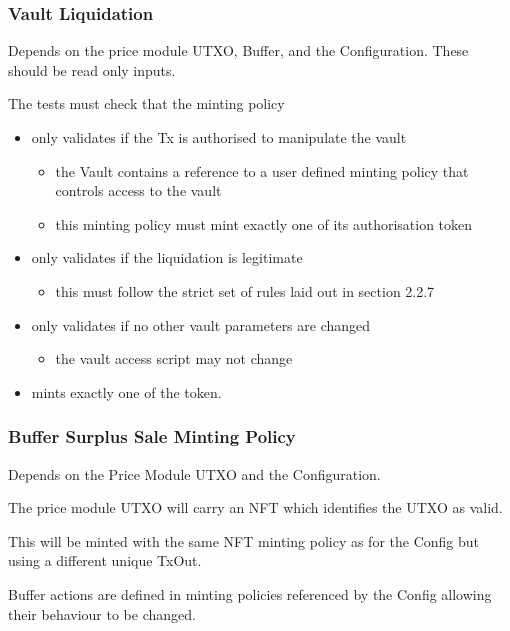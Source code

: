 \documentclass{article} %
\begin{document}
\subsubsection{Vault Liquidation}
Depends on the price module UTXO, Buffer, and the Configuration.
These should be read only inputs.

The tests must check that the minting policy
\begin{itemize}
  \item only validates if the Tx is authorised to manipulate the vault
  \begin{itemize}
    \item the Vault contains a reference to a user defined minting policy that controls access to the vault
    \item this minting policy must mint exactly one of its authorisation token
  \end{itemize}
  \item only validates if the liquidation is legitimate
  \begin{itemize}
    \item this must follow the strict set of rules laid out in section 2.2.7
  \end{itemize}
  \item only validates if no other vault parameters are changed
  \begin{itemize}
    \item the vault access script may not change
  \end{itemize}
  \item mints exactly one of the token.
\end{itemize}

\subsubsection{Buffer Surplus Sale Minting Policy}
Depends on the Price Module UTXO and the Configuration.

The price module UTXO will carry an NFT which identifies the UTXO as valid.

This will be minted with the same NFT minting policy as for the Config but using a different unique TxOut.

Buffer actions are defined in minting policies referenced by the Config allowing their behaviour to be changed.
\end{document}
